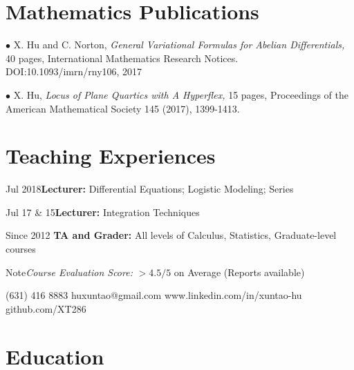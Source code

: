 \documentclass{tccv}
\begin{document}
\section{Mathematics Publications}
\begin{eventlist}
\item{}$\bullet$ {X. Hu} and C. Norton,  \textit{General Variational Formulas for Abelian Differentials,} 40 pages, International Mathematics Research Notices. \\DOI:10.1093/imrn/rny106, 2017

\item {}$\bullet$ {X. Hu},  \textit{Locus of Plane Quartics with A Hyperflex,} 15 pages,
Proceedings of the American Mathematical Society 145 (2017), 1399-1413.

\end{eventlist}


\section{Teaching Experiences}
\begin{factlist}
\item{Jul 2018}{\textbf{Lecturer:} Differential Equations; Logistic Modeling; Series}
\item{Jul 17 \& 15}{\textbf{Lecturer:} Integration Techniques}
\item{Since 2012} {\textbf{TA and Grader:} All levels of Calculus, Statistics, Graduate-level courses}
\item{Note}{{\em Course Evaluation Score:} $>4.5/5$ on Average (Reports available)}
\end{factlist}

    {(631) 416 8883}
    {huxuntao@gmail.com}
    {www.linkedin.com/in/xuntao-hu}
    {github.com/XT286}
    

\section{Education}
\end{document}
